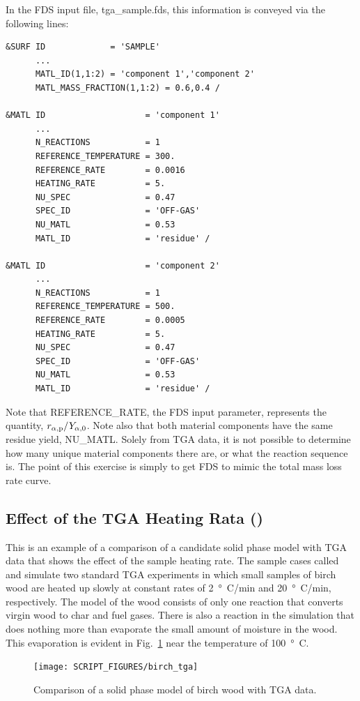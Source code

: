 \documentclass[11pt]{book}
\begin{document}
In the FDS input file, {\ct tga\_sample.fds}, this information is conveyed via the following lines:
\begin{lstlisting}
&SURF ID             = 'SAMPLE'
      ...
      MATL_ID(1,1:2) = 'component 1','component 2'
      MATL_MASS_FRACTION(1,1:2) = 0.6,0.4 /

&MATL ID                    = 'component 1'
      ...
      N_REACTIONS           = 1
      REFERENCE_TEMPERATURE = 300.
      REFERENCE_RATE        = 0.0016
      HEATING_RATE          = 5.
      NU_SPEC               = 0.47
      SPEC_ID               = 'OFF-GAS'
      NU_MATL               = 0.53
      MATL_ID               = 'residue' /

&MATL ID                    = 'component 2'
      ...
      N_REACTIONS           = 1
      REFERENCE_TEMPERATURE = 500.
      REFERENCE_RATE        = 0.0005
      HEATING_RATE          = 5.
      NU_SPEC               = 0.47
      SPEC_ID               = 'OFF-GAS'
      NU_MATL               = 0.53
      MATL_ID               = 'residue' /
\end{lstlisting}
Note that {\ct REFERENCE\_RATE}, the FDS input parameter, represents the quantity, $r_{\alpha,{\rm p}}/Y_{\alpha,0}$. Note also that both material components have the same residue yield, {\ct NU\_MATL}. Solely from TGA data, it is not possible to determine how many unique material components there are, or what the reaction sequence is. The point of this exercise is simply to get FDS to mimic the total mass loss rate curve.


\subsection{Effect of the TGA Heating Rata (\texorpdfstring{}{birch\_tga})}
\label{birch_tga}

This is an example of a comparison of a candidate solid phase model with TGA data that shows the effect of the sample heating rate. The sample cases called  and  simulate two standard TGA experiments in which small samples of birch wood are heated up slowly at constant rates of 2~\si{\degree C}/min and 20~\si{\degree C}/min, respectively. The model of the wood consists of only one reaction that converts virgin wood to char and fuel gases. There is also a reaction in the simulation that does nothing more than evaporate the small amount of moisture in the wood. This evaporation is evident in Fig.~\ref{fig_birch_tga} near the temperature of 100~\si{\degree C}.
\begin{figure}[!htb]
\centering
\texttt{[image: SCRIPT\_FIGURES/birch\_tga]}
\caption[An example of TGA data]{\label{fig_birch_tga} Comparison of a solid phase model of birch wood with TGA data.}
\end{figure}
\end{document}
